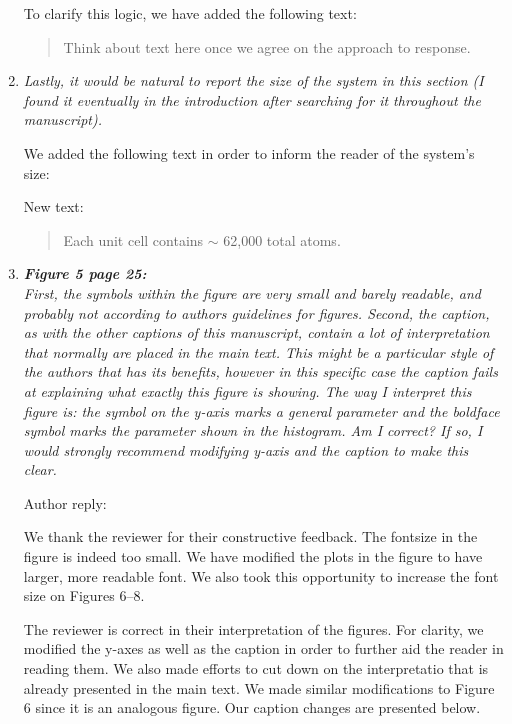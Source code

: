 \documentclass{article}
\begin{document}
\begin{enumerate}[label={Comment \theenumi :}, leftmargin=3.9\parindent]
  To clarify this logic, we have added the following text:

  \begin{quote}
    Think about text here once we agree on the approach to response.
    \end{quote}
        
\item \textit{Lastly, it would be natural to report the size of the
  system in this section (I found it eventually in the introduction
  after searching for it throughout the manuscript).}

  We added the following text in order to inform the reader of the system's size:
  
  New text:
  \begin{quote}
  Each unit cell contains $\sim$ 62,000 total atoms. %
  \end{quote}
  

  \item \textit{\textbf{Figure 5 page 25:} \\
		First, the symbols within the figure are very small and barely readable, and probably not
		according to authors guidelines for figures. Second, the caption, as with the other captions of
		this manuscript, contain a lot of interpretation that normally are placed in the main text. This
		might be a particular style of the authors that has its benefits, however in this specific case the
		caption fails at explaining what exactly this figure is showing. The way I interpret this figure is:
		the symbol on the y-axis marks a general parameter and the boldface symbol marks the
		parameter shown in the histogram. Am I correct? If so, I would strongly recommend modifying
		y-axis and the caption to make this clear.}
		
		Author reply:
		
		We thank the reviewer for their constructive feedback. The fontsize in the figure is indeed too small.
		We have modified the plots in the figure to have larger, more readable font. We also took this 
		opportunity to increase the font size on Figures 6--8.
		
		The reviewer is correct in their interpretation of the figures. For clarity, we modified the y-axes as
		well as the caption in order to further aid the reader in reading them. We also made efforts to cut
                down on the interpretatio that is already presented in the main text.
                We made similar modifications to Figure 6 since it is an
		analogous figure. Our caption changes are presented below.
		

\end{enumerate}
\end{document}
